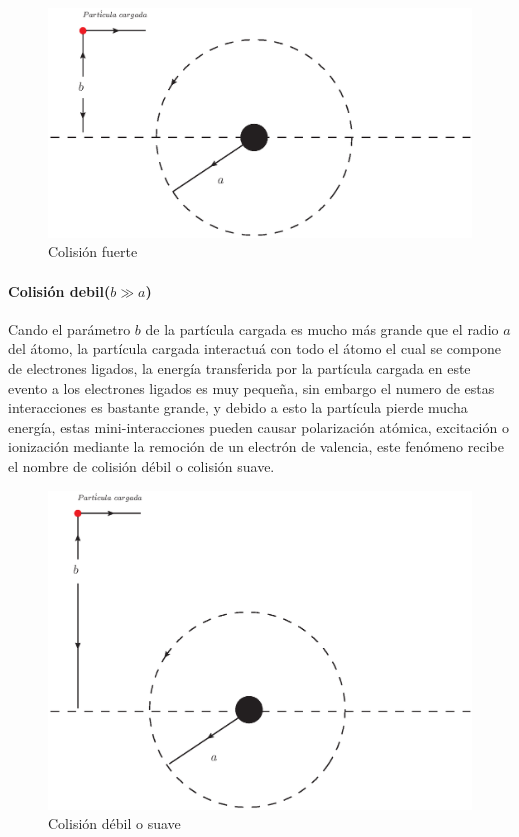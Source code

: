 \begin{figure}[htbp]
   \centering
   \includegraphics[width=.6\linewidth]{./Figures/hardcoli.eps}
   \caption{Colisión fuerte}
   \label{fig:cf}
\end{figure}

\paragraph{Colisión debil($b\gg a$)}
Cando el parámetro $b$ de la partícula cargada es mucho más grande que el radio $a$ del átomo, la partícula cargada interactuá con todo el átomo el cual se compone de electrones ligados, la energía transferida por la partícula cargada en este evento a los electrones ligados es muy pequeña, sin embargo el numero de estas interacciones es bastante grande, y debido a esto la partícula pierde mucha energía, estas mini-interacciones pueden causar polarización atómica, excitación o ionización mediante la remoción de un electrón de valencia, este fenómeno recibe el nombre de colisión débil o colisión suave\cite{Podgorsak}.

\begin{figure}[htbp]
   \centering
   \includegraphics[width=.6\linewidth]{./Figures/softcoli.eps}
   \caption{Colisión débil o suave}
   \label{fig:cd}
\end{figure}
